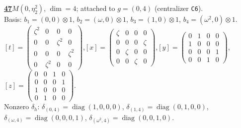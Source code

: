 \begin{samepage}\noindent\textbf{\underline{47}}\quad $M(0,\eta^{2}_{2})$, $\dim=4$; attached to $g=(0,4)$ (centralizer \texttt{C6}).\\
Basis: $b_{1}=(0,0)\otimes 1$, $b_{2}=(\omega,0)\otimes 1$, $b_{3}=(1,0)\otimes 1$, $b_{4}=(\omega^2,0)\otimes 1$.\\
$[t]=\left(\begin{smallmatrix} \zeta^2 & 0 & 0 & 0 \\ 0 & 0 & \zeta^2 & 0 \\ 0 & 0 & 0 & \zeta^2 \\ 0 & \zeta^2 & 0 & 0 \end{smallmatrix}\right)$,\quad $[x]=\left(\begin{smallmatrix} \zeta & 0 & 0 & 0 \\ 0 & 0 & 0 & \zeta \\ 0 & \zeta & 0 & 0 \\ 0 & 0 & \zeta & 0 \end{smallmatrix}\right)$,\quad $[y]=\left(\begin{smallmatrix} 0 & 1 & 0 & 0 \\ 1 & 0 & 0 & 0 \\ 0 & 0 & 0 & 1 \\ 0 & 0 & 1 & 0 \end{smallmatrix}\right)$,\quad $[z]=\left(\begin{smallmatrix} 0 & 0 & 1 & 0 \\ 0 & 0 & 0 & 1 \\ 1 & 0 & 0 & 0 \\ 0 & 1 & 0 & 0 \end{smallmatrix}\right)$.\\
Nonzero $\delta_h$: $\delta_{(0,4)}=\operatorname{diag}(1,0,0,0)$, $\delta_{(1,4)}=\operatorname{diag}(0,1,0,0)$, $\delta_{(\omega,4)}=\operatorname{diag}(0,0,0,1)$, $\delta_{(\omega^2,4)}=\operatorname{diag}(0,0,1,0)$.\end{samepage}
\medskip

